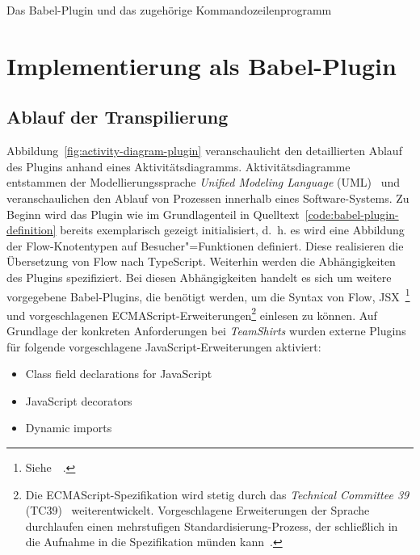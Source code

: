 Das Babel-Plugin und das zugehörige Kommandozeilenprogramm

\section{Implementierung als Babel-Plugin}

\subsection{Ablauf der Transpilierung}


Abbildung~\ref{fig:activity-diagram-plugin} veranschaulicht den detaillierten Ablauf des Plugins anhand eines Aktivitätsdiagramms. Aktivitätsdiagramme entstammen der Modellierungssprache \textit{Unified Modeling Language} (UML)~\autocite{OMG:UML} und veranschaulichen den Ablauf von Prozessen innerhalb eines Software-Systems.
Zu Beginn wird das Plugin wie im Grundlagenteil in Quelltext~\ref{code:babel-plugin-definition} bereits exemplarisch gezeigt initialisiert, d.~h. es wird eine Abbildung der Flow-Knotentypen auf Besucher"=Funktionen definiert. Diese realisieren die Übersetzung von Flow nach TypeScript.
Weiterhin werden die Abhängigkeiten des Plugins spezifiziert. Bei diesen Abhängigkeiten handelt es sich um weitere vorgegebene Babel-Plugins, die benötigt werden, um die Syntax von Flow, JSX~\footnote{Siehe~~\autocite{SOFTWARE:JSX}.} und vorgeschlagenen ECMAScript-Erweiterungen\footnote{Die ECMAScript-Spezifikation wird stetig durch das \textit{Technical Committee 39} (TC39)~\autocite{TC39_COMMITTEE} weiterentwickelt. Vorgeschlagene Erweiterungen der Sprache durchlaufen einen mehrstufigen Standardisierung-Prozess, der schließlich in die Aufnahme in die Spezifikation münden kann~\autocite{TC39_PROCESS}.} einlesen zu können. Auf Grundlage der konkreten Anforderungen bei \textit{TeamShirts} wurden externe Plugins für folgende vorgeschlagene JavaScript-Erweiterungen aktiviert:

\begin{itemize}
  \item Class field declarations for JavaScript~\autocite{ES_PROPOSAL:CLASS_FIELDS}
  \item JavaScript decorators~\autocite{ES_PROPOSAL:DECORATORS}
  \item Dynamic imports~\autocite{ES_PROPOSAL:DYNAMIC_IMPORTS}
\end{itemize}

